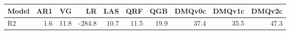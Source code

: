 \begin{tabular}{lrrrrrrrrr}
\toprule
Model & AR1 & VG & LR & LAS & QRF & QGB & DMQv0c & DMQv1c & DMQv2c \\
\midrule
R2 & 1.6 & 11.8 & -284.8 & 10.7 & 11.5 & 19.9 & 37.4 & 35.5 & 47.3 \\
\bottomrule
\end{tabular}
